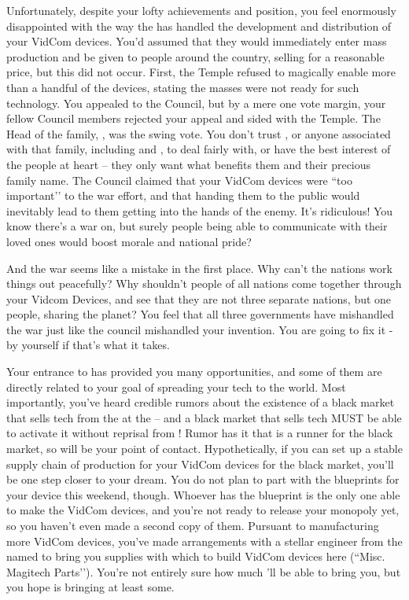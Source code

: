 \documentclass[char]{GL2020}
\begin{document}
Unfortunately, despite your lofty achievements and position, you feel enormously disappointed with the way the \pTech{} has handled the development and distribution of your VidCom devices.  You'd assumed that they would immediately enter mass production and be given to people around the country, selling for a reasonable price, but this did not occur. First, the Temple refused to magically enable more than a handful of the devices, stating the masses were not ready for such technology. You appealed to the Council, but by a mere one vote margin, your fellow Council members rejected your appeal and sided with the Temple. The Head of the \cHeir{\formal} family, \cFaledonParent{\full}, was the swing vote. You don't trust \cFaledonParent{\them}, or anyone associated with that family, including \cHeir{\full} and \cDiplomat{\full}, to deal fairly with, or have the best interest of the people at heart – they only want what benefits them and their precious family name. The Council claimed that your VidCom devices were ``too important'’ to the war effort, and that handing them to the public would inevitably lead to them getting into the hands of the enemy. It's ridiculous! You know there's a war on, but surely people being able to communicate with their loved ones would boost morale and national pride? 

And the war seems like a mistake in the first place. Why can't the nations work things out peacefully? Why shouldn't people of all nations come together through your Vidcom Devices, and see that they are not three separate nations, but one people, sharing the planet? You feel that all three governments have mishandled the war just like the council mishandled your invention. You are going to fix it - by yourself if that's what it takes.

Your entrance to \pSchool{} has provided you many opportunities, and some of them are directly related to your goal of spreading your tech to the world. Most importantly, you've heard credible rumors about the existence of a black market that sells tech from the \pTech{} at the \pSc{} – and a black market that sells tech MUST be able to activate it without reprisal from \cTechGod{}! Rumor has it that \cLibAssist{\full} is a runner for the black market, so \cLibAssist{\they} will be your point of contact. Hypothetically, if you can set up a stable supply chain of production for your VidCom devices for the black market, you'll be one step closer to your dream. You do not plan to part with the blueprints for your device this weekend, though. Whoever has the blueprint is the only one able to make the VidCom devices, and you're not ready to release your monopoly yet, so you haven't even made a second copy of them. Pursuant to manufacturing more VidCom devices, you've made arrangements with a stellar engineer from the \pShip{} named \cBunker{\full} to bring you supplies with which to build VidCom devices here (``Misc. Magitech Parts'’). You're not entirely sure how much \cBunker{\they}'ll be able to bring you, but you hope \cBunker{\they} is bringing at least some. 
\end{document}
